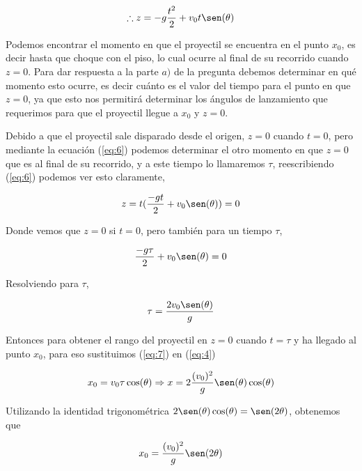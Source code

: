 \documentclass[a4paper,10pt]{article}
\begin{document}
\begin{equation}
 \therefore z = - g \frac{t^2}{2} + v_0 t \sen(\theta)
 \label{eq:6}
\end{equation}

Podemos encontrar el momento en que el proyectil se encuentra en el punto $x_0$, 
es decir hasta que choque con el piso, lo cual ocurre al final de su recorrido cuando $z=0$.
Para dar respuesta a la parte $a)$ de la pregunta debemos determinar en qué momento
esto ocurre, es decir cuánto es el valor del tiempo para el punto en que 
$z=0$, ya que esto nos permitirá determinar los ángulos de lanzamiento
que requerimos para que el proyectil llegue a $x_0$ y $z=0$.

\vspace{.3cm}

Debido a que el proyectil sale disparado desde el origen, $z=0$ cuando
$t=0$, pero mediante la ecuación (\ref{eq:6}) podemos determinar el otro
momento en que $z=0$ que es al final de su recorrido, y a este tiempo
lo llamaremos $\tau$, reescribiendo (\ref{eq:6}) podemos ver esto claramente,

\begin{equation*}
 z = t(\frac{-gt}{2} + v_0 \sen(\theta)) = 0
\end{equation*}

Donde vemos que $z=0$ si $t=0$, pero también para un tiempo $\tau$,

\begin{equation*}
 \frac{-g\tau}{2} + v_0 \sen(\theta) = 0
\end{equation*}

Resolviendo para $\tau$,

\begin{equation}
 \tau = \frac{2v_0\sen(\theta)}{g}
 \label{eq:7}
\end{equation}

Entonces para obtener el rango del proyectil en $z=0$ cuando
$t=\tau$ y ha llegado al punto $x_0$, para eso sustituimos (\ref{eq:7}) en (\ref{eq:4})

\begin{equation*}
 x_0 = v_0 \tau \cos(\theta) \Rightarrow x = 2 \frac{(v_0)^2}{g} \sen(\theta)\cos(\theta)
\end{equation*}

Utilizando la identidad trigonométrica $2\sen(\theta)\cos(\theta) = \sen (2\theta)$,
obtenemos que

\begin{equation}
 x_0 = \frac{(v_0)^2}{g} \sen(2\theta)
 \label{eq:8}
\end{equation}
\end{document}
